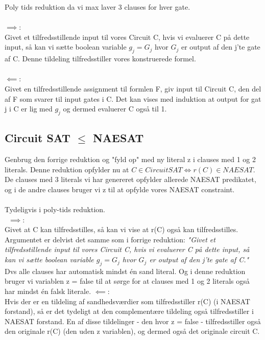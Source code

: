 \documentclass{article}
\begin{document}
Poly tids reduktion da vi max laver 3 clauses for hver gate.\\\\
$\implies$: \\
Givet et tilfredsstillende input til vores Circuit C, hvis vi evaluerer C på dette input, så kan vi sætte boolean variable $g_j = G_j$ hvor $G_j$ er output af den j'te gate af C. Denne tildeling tilfredsstiller vores konstruerede formel.\\\\
$\impliedby$: \\
Givet en tilfredsstillende assignment til formlen F, giv input til Circuit C, den del af F som svarer til input gates i C. Det kan vises med induktion at output for gat j i C er lig med $g_j$ og dermed evaluerer C også til 1.
\subsection{Circuit SAT $\le$ NAESAT}
Genbrug den forrige reduktion og "fyld op" med ny literal z i clauses med 1 og 2 literals. Denne reduktion opfylder nu at $C \in CircuitSAT \iff r(C) \in NAESAT$. De clauses med 3 literals vi har genereret opfylder allerede NAESAT predikatet, og i de andre clauses bruger vi z til at opfylde vores NAESAT constraint. \\\\
Tydeligvis i poly-tids reduktion.\\\
$\implies$: \\
Givet at C kan tilfredsstilles, så kan vi vise at r(C) også kan tilfredsstilles.
Argumentet er delvist det samme som i forrige reduktion: \textit{"Givet et tilfredsstillende input til vores Circuit C, hvis vi evaluerer C på dette input, så kan vi sætte boolean variable $g_j = G_j$ hvor $G_j$ er output af den j'te gate af C."}
Dvs alle clauses har automatisk mindst én sand literal. Og i denne reduktion bruger vi variablen z = false til at sørge for at clauses med 1 og 2 literals også har mindst én  falsk literale.
$\impliedby$: \\
Hvis der er en tildeling af sandhedsværdier som tilfredsstiller r(C) (i NAESAT forstand), så er det tydeligt at den complementære tildeling også tilfredsstiller i NAESAT forstand. En af disse tildelinger - den hvor z = false - tilfredsstiller også den originale r(C) (den uden z variablen), og dermed også det originale circuit C. \\\\
\end{document}
